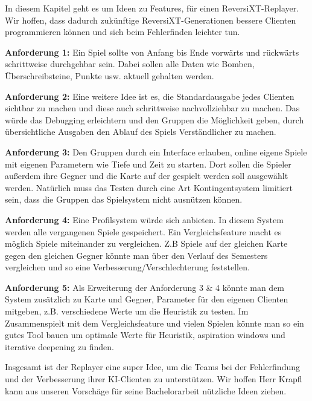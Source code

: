 \documentclass[12pt,a4paper,bibliography=totocnumbered,listof=totocnumbered]{scrartcl}
\begin{document}
	In diesem Kapitel geht es um Ideen zu Features, für einen ReversiXT-Replayer. Wir hoffen, dass dadurch zukünftige ReversiXT-Generationen bessere Clienten programmieren können und sich beim Fehlerfinden leichter tun.
	
	\textbf{Anforderung 1:} Ein Spiel sollte von Anfang bis Ende vorwärts und rückwärts schrittweise durchgehbar sein. Dabei sollen alle Daten wie Bomben, Überschreibsteine, Punkte usw. aktuell gehalten werden.
	
	\textbf{Anforderung 2:} Eine weitere Idee ist es, die Standardausgabe jedes Clienten sichtbar zu machen und diese auch schrittweise nachvollziehbar zu machen. Das würde das Debugging erleichtern und den Gruppen die Möglichkeit geben, durch übersichtliche Ausgaben den Ablauf des Spiels Verständlicher zu machen.
	
	\textbf{Anforderung 3:} Den Gruppen durch ein Interface erlauben, online eigene Spiele mit eigenen Parametern wie Tiefe und Zeit zu starten. Dort sollen die Spieler außerdem ihre Gegner und die Karte auf der gespielt werden soll ausgewählt werden. Natürlich muss das Testen durch eine Art Kontingentsystem limitiert sein, dass die Gruppen das Spielsystem nicht ausnützen können. 
	
	\textbf{Anforderung 4:} Eine Profilsystem würde sich anbieten. In diesem System werden alle vergangenen Spiele gespeichert. Ein Vergleichsfeature macht es möglich Spiele miteinander zu vergleichen. Z.B Spiele auf der gleichen Karte gegen den gleichen Gegner könnte man über den Verlauf des Semesters vergleichen und so eine Verbesserung/Verschlechterung feststellen.
	
	\textbf{Anforderung 5:} Als Erweiterung der Anforderung 3 \& 4 könnte man dem System zusätzlich zu Karte und Gegner, Parameter für den eigenen Clienten mitgeben, z.B. verschiedene Werte um die Heuristik zu testen. Im Zusammenspielt mit dem Vergleichsfeature und vielen Spielen könnte man so ein gutes Tool bauen um optimale Werte für Heuristik, aspiration windows und iterative deepening zu finden.
	
	Insgesamt ist der Replayer eine super Idee, um die Teams bei der Fehlerfindung und der Verbesserung ihrer KI-Clienten zu unterstützen. Wir hoffen Herr Krapfl kann aus unseren Vorschäge für seine Bachelorarbeit nützliche Ideen ziehen.
	
    \newpage
\end{document}
